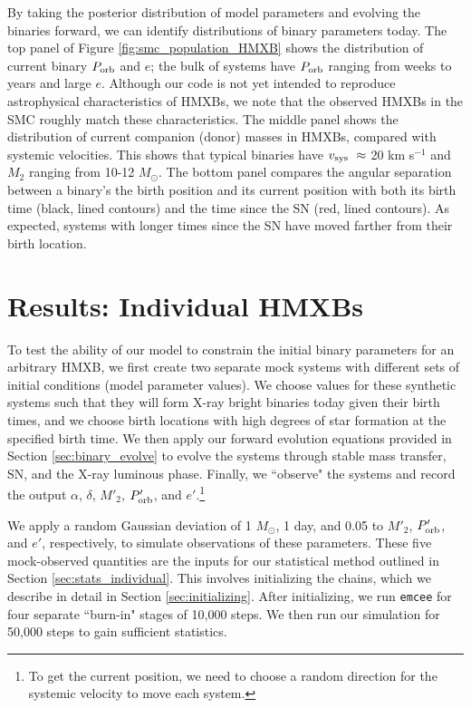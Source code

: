 \documentclass[12pt, preprint]{aastex}
\newcommand{\Msun}{\ifmmode {M_{\odot}}\else${M_{\odot}}$\fi}
\begin{document}
By taking the posterior distribution of model parameters and evolving the binaries forward, we can identify distributions of binary parameters today. The top panel of Figure \ref{fig:smc_population_HMXB} shows the distribution of current binary $P_{\rm orb}$ and $e$; the bulk of systems have $P_{\rm orb}$ ranging from weeks to years and large $e$. Although our code is not yet intended to reproduce astrophysical characteristics of HMXBs, we note that the observed HMXBs in the SMC roughly match these characteristics. The middle panel shows the distribution of current companion (donor) masses in HMXBs, compared with systemic velocities. This shows that typical binaries have $v_{\rm sys}\ \approx$ 20 km s$^{-1}$ and $M_2$ ranging from 10-12 \Msun. The bottom panel compares the angular separation between a binary's the birth position and its current position with both its birth time (black, lined contours) and the time since the SN (red, lined contours). As expected, systems with longer times since the SN have moved farther from their birth location. 




\section{Results: Individual HMXBs} \label{sec:results_individual}

To test the ability of our model to constrain the initial binary parameters for an arbitrary HMXB, we first create two separate mock systems with different sets of initial conditions (model parameter values). We choose values for these synthetic systems such that they will form X-ray bright binaries today given their birth times, and we choose birth locations with high degrees of star formation at the specified birth time. We then apply our forward evolution equations provided in Section \ref{sec:binary_evolve} to evolve the systems through stable mass transfer, SN, and the X-ray luminous phase. Finally, we ``observe" the systems and record the output $\alpha$, $\delta$, $M'_2$, $P'_{\rm orb}$, and $e'$.\footnote{To get the current position, we need to choose a random direction for the systemic velocity to move each system.} 

We apply a random Gaussian deviation of 1 \Msun, 1 day, and 0.05 to $M'_2$, $P'_{\rm orb}$, and $e'$, respectively, to simulate observations of these parameters. These five mock-observed quantities are the inputs for our statistical method outlined in Section \ref{sec:stats_individual}. This involves initializing the chains, which we describe in detail in Section \ref{sec:initializing}. After initializing, we run {\tt emcee} for four separate ``burn-in" stages of 10,000 steps. We then run our simulation for 50,000 steps to gain sufficient statistics. 
\end{document}
